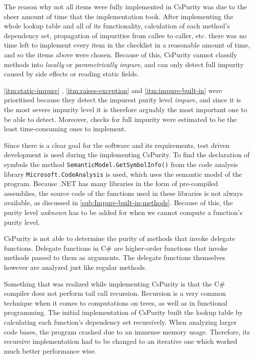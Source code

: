 \documentclass[a4paper,12pt]{article}
\newcommand{\Autoref}[1]{%
  \begingroup%
  \def\chapterautorefname{Chapter}%
  \def\sectionautorefname{Section}%
  \def\subsectionautorefname{Subsection}%
  \def\itemautorefname{Item}%
  \autoref{#1}%
  \endgroup%
}
\begin{document}
The reason why not all items were fully implemented in CsPurity was due to the sheer amount of time that the implementation took. After implementing the whole lookup table and all of its functionality, calculation of each method's dependency set, propagation of impurities from callee to caller, etc. there was no time left to implement every item in the checklist in a reasonable amount of time, and so the items above were chosen. Because of this, CsPurity cannot classify methods into \textit{locally} or \textit{parametrically impure}, and can only detect full impurity caused by side effects or reading static fields.

\Autoref{itm:static-impure}, \ref{itm:raises-exception} and \ref{itm:impure-built-in} were prioritised because they detect the impurest purity level \textit{impure}, and since it is the most severe impurity level it is therefore arguably the most important one to be able to detect. Moreover, checks for full impurity were estimated to be the least time-consuming ones to implement.

Since there is a clear goal for the software and its requirements, test driven development is used during the implementing CsPurity. To find the declaration of symbols the method \texttt{SemanticModel.GetSymbolInfo()} from the code analysis library \texttt{Microsoft.CodeAnalysis} is used, which uses the semantic model of the program. Because .NET has many libraries in the form of pre-compiled assemblies, the source code of the functions used in these libraries is not always available, as discussed in \autoref{sub:Impure-built-in-methods}. Because of this, the purity level \textit{unknown} has to be added for when we cannot compute a function's purity level.

CsPurity is not able to determine the purity of methods that invoke delegate functions. Delegate functions in C\# are higher-order functions that invoke methods passed to them as arguments. The delegate functions themselves however are analyzed just like regular methods.

Something that was realized while implementing CsPurity is that the C\# compiler does not perform tail call recursion. Recursion is a very common technique when it comes to computations on trees, as well as in functional programming. The initial implementation of CsPurity built the lookup table by calculating each function's dependency set recursively. When analyzing larger code bases, the program crashed due to an immense memory usage. Therefore, its recursive implementation had to be changed to an iterative one which worked much better performance wise.
\end{document}
